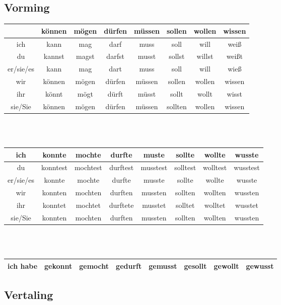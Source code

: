 \documentclass[main.tex]{subfiles}
\begin{document}
\subsection{Vorming}
\begin{tabular}{|c|c|c|c|c|c|c|c|}
\hline 
\rowcolor{gray}
 & können & mögen & dürfen & müssen & sollen & wollen & wissen \\ 
\hline 
ich & kann & mag & darf & muss & soll & will & weiß \\ 
\hline 
du & kannst & magst & darfst & musst & sollst & willst & weißt \\ 
\hline 
er/sie/es & kann & mag & dart & muss & soll & will & wieß \\ 
\hline 
wir  & können & mögen & dürfen & müssen & sollen & wollen & wissen \\ 
\hline 
ihr & könnt & mögt & dürft & müsst & sollt & wollt & wisst \\ 
\hline 
sie/Sie & können & mögen & dürfen & müssen & sollten & wollen & wissen \\ 
\hline 
\end{tabular} 
\\
\\
\begin{tabular}{|c|c|c|c|c|c|c|c|}
\hline 
ich & konnte & mochte & durfte & muste & sollte & wollte & wusste \\ 
\hline 
du & konntest & mochtest & durftest & musstest & solltest & wolltest & wusstest \\ 
\hline 
er/sie/es & konnte & mochte & durfte & musste & sollte & wollte & wusste \\ 
\hline 
wir & konnten & mochten & durften & mussten & sollten & wollten & wussten \\ 
\hline 
ihr & konntet & mochtet & durftete & musstet & solltet & wolltet & wusstet \\ 
\hline 
sie/Sie & konnten & mochten & durften & mussten & sollten & wollten & wussten \\ 
\hline 
\end{tabular} 
\\
\\
\begin{tabular}{|c|c|c|c|c|c|c|c|}
\hline
ich habe & gekonnt & gemocht & gedurft & gemusst & gesollt & gewollt & gewusst \\
\hline
\end{tabular}
\subsection{Vertaling}
\end{document}
